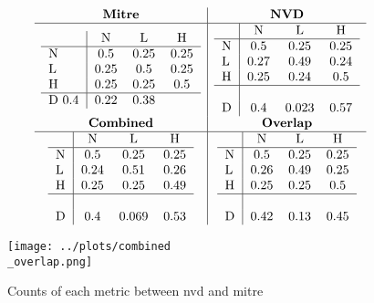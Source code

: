 \documentclass[11pt]{article}
\begin{document}
\begin{table}
	\centering
	\caption{Confusion matrices availabilityImpact}
	\label{table:mitre-availabilityImpact}
	\[
		\begin{array}{c|c}
			\textbf{Mitre}    & \textbf{NVD}     \\
			\hline
			\begin{tabular}{l|ccc}
				      & N    & L    & H    \\
				\hline
				N     & 0.5  & 0.25 & 0.25 \\
				L     & 0.25 & 0.5  & 0.25 \\
				H     & 0.25 & 0.25 & 0.5  \\
				\hline
				D 0.4 & 0.22 & 0.38
			\end{tabular}
			                  &
			\begin{tabular}{l|ccc}
				  & N    & L     & H    \\
				\hline
				N & 0.5  & 0.25  & 0.25 \\
				L & 0.27 & 0.49  & 0.24 \\
				H & 0.25 & 0.24  & 0.5  \\
				\hline                  \\
				D & 0.4  & 0.023 & 0.57 \\
			\end{tabular}
			\\
			\textbf{Combined} & \textbf{Overlap} \\
			\hline
			\begin{tabular}{l|ccc}
				  & N    & L     & H    \\
				\hline
				N & 0.5  & 0.25  & 0.25 \\
				L & 0.24 & 0.51  & 0.26 \\
				H & 0.25 & 0.25  & 0.49 \\
				\hline                  \\
				D & 0.4  & 0.069 & 0.53 \\
			\end{tabular}
			                  &
			\begin{tabular}{l|ccc}
				  & N    & L    & H    \\
				\hline
				N & 0.5  & 0.25 & 0.25 \\
				L & 0.26 & 0.49 & 0.25 \\
				H & 0.25 & 0.25 & 0.5  \\
				\hline                 \\
				D & 0.42 & 0.13 & 0.45 \\
			\end{tabular}
		\end{array}
	\]
\end{table}

\begin{figure}[htbp]
	\centering
	\texttt{[image: ../plots/combined\\\_overlap.png]}
	\caption{Counts of each metric between nvd and mitre}
	\label{fig:comparison}
\end{figure}




\noindent
\end{document}
